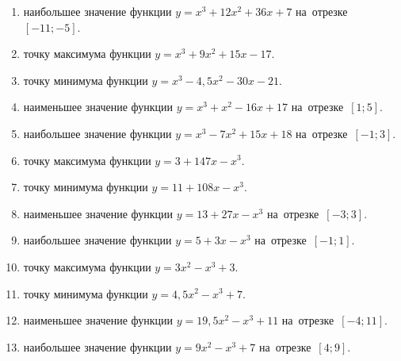 \documentclass[a4paper,10pt]{article}
\begin{document}
\begin{enumerate}
\item {} наибольшее значение функции $y=x^3 +12x^2+36x+7$ на~отрезке~$\left[-11;-5\right]$.

\item {} точку максимума функции $y=x^3 +9x^2+15x-17$.

\item {} точку минимума функции $y=x^3 -4,5x^2-30x-21$.

\item {} наименьшее значение функции $y=x^3 +x^2-16x+17$ на~отрезке~$\left[1;5\right]$.

\item {} наибольшее значение функции $y=x^3 -7x^2+15x+18$ на~отрезке~$\left[-1;3\right]$.

\item {} точку максимума функции $y=3+147x-x^3$.







\item {} точку минимума функции $y=11+108x-x^3$.







\item {} наименьшее значение функции $y=13+27x-x^3$ на~отрезке~$\left[-3;3\right]$.







\item {} наибольшее значение функции $y=5+3x-x^3$ на~отрезке~$\left[-1;1\right]$.







\item {} точку максимума функции $y=3x^2-x^3+3$.

\item {} точку минимума функции $y=4,5x^2-x^3+7$.

\item {} наименьшее значение функции $y=19,5x^2-x^3+11$ на~отрезке~$\left[-4;11\right]$.

\item {} наибольшее значение функции $y=9x^2-x^3+7$ на~отрезке~$\left[4;9\right]$.


\end{enumerate}
\end{document}
